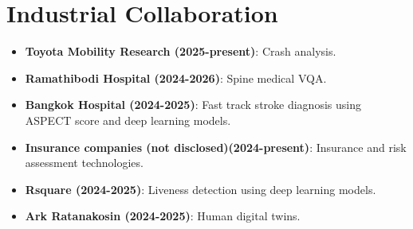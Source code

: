 \documentclass[letterpaper,11pt]{article}
\newcommand{\resumeItem}[2]{
  \item\small{
    \textbf{#1}{: #2 \vspace{-2pt}}
  }
}
\newcommand{\resumeSubItem}[2]{\resumeItem{#1}{#2}\vspace{-4pt}}
\newcommand{\resumeSubHeadingListStart}{\begin{itemize}[leftmargin=*]}
\newcommand{\resumeSubHeadingListEnd}{\end{itemize}}
\begin{document}
\section*{Industrial Collaboration}
\resumeSubHeadingListStart
\resumeSubItem{Toyota Mobility Research (2025-present)}
{Crash analysis.}
\resumeSubItem{Ramathibodi Hospital (2024-2026)}
{Spine medical VQA.}
\resumeSubItem{Bangkok Hospital (2024-2025)}
{Fast track stroke diagnosis using ASPECT score and deep learning models.}
\resumeSubItem{Insurance companies (not disclosed)(2024-present)}
{Insurance and risk assessment technologies.}
\resumeSubItem{Rsquare (2024-2025)}
{Liveness detection using deep learning models.}
\resumeSubItem{Ark Ratanakosin (2024-2025)}
{Human digital twins.}
\resumeSubHeadingListEnd

\end{document}
